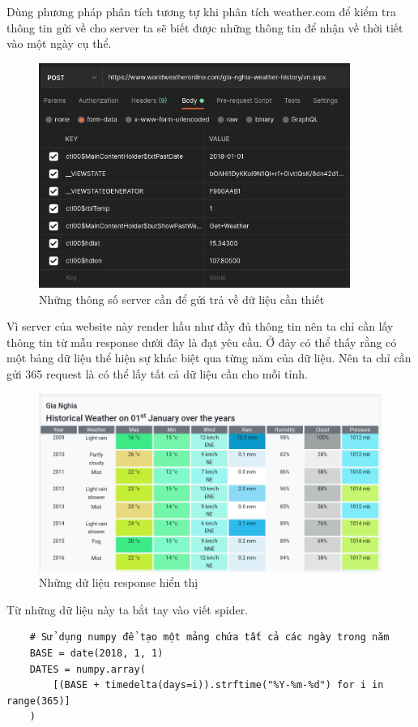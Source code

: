 \documentclass{article}
\begin{document}
Dùng phương pháp phân tích tương tự khi phân tích weather.com để kiểm tra thông tin gửi về cho server ta sẽ biết được những thông tin để nhận về thời tiết vào một ngày cụ thể.

\begin{figure}[H]
	\centering
	\includegraphics[width=4in]{images/wwo-history-postman.png}
	\caption{
		Những thông số server cần để gửi trả về dữ liệu cần thiết}
\end{figure}

Vì server của website này render hầu như đầy đủ thông tin nên ta chỉ cần lấy thông tin từ mẫu response dưới đây là đạt yêu cầu. Ở đây có thể thấy rằng có một bảng dữ liệu thể hiện sự khác biệt qua từng năm của dữ liệu. Nên ta chỉ cần gửi 365 request là có thể lấy tất cả dữ liệu cần cho mỗi tỉnh.

\begin{figure}[H]
	\centering
	\includegraphics[width=6in]{images/wwo-display-data.png}
	\caption{
		Những dữ liệu response hiển thị}
\end{figure}

Từ những dữ liệu này ta bắt tay vào viết spider.

\begin{verbatim}
	# Sử dụng numpy để tạo một mảng chứa tất cả các ngày trong năm 
	BASE = date(2018, 1, 1)
	DATES = numpy.array(
    	[(BASE + timedelta(days=i)).strftime("%Y-%m-%d") for i in range(365)]
	)
\end{verbatim}
\end{document}

